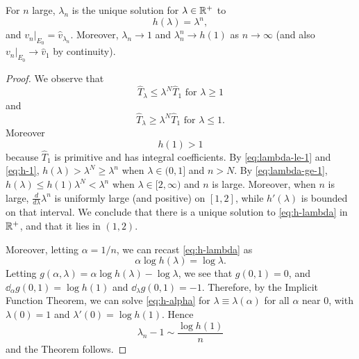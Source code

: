 \documentclass[12pt]{amsart}
\begin{document}
\begin{theorem} \label{thm:clone-eigen}
For $n$ large, 
$\lambda_n$ is the unique solution for $\lambda \in \mathbb R^+$ to
\begin{equation} \label{eq:h-lambda}
h(\lambda) = \lambda^n,
\end{equation}
and $v_n|_{E_0} = \hat v_{\lambda_n}$. 
Moreover, $\lambda_n \to 1$ and $\lambda_n^n \to h(1)$ as $n\to \infty$ (and also $v_n|_{E_0} \to \hat v_1$ by continuity). 
\end{theorem}

\begin{proof}
We observe that 
\begin{equation} \label{eq:lambda-ge-1}
\hat T_\lambda \le \lambda^N \hat T_1 \text{ for $\lambda \ge 1$}
\end{equation}
and 
\begin{equation} \label{eq:lambda-le-1}
\hat T_\lambda \ge \lambda^N \hat T_1 \text{ for $\lambda \le 1$}.
\end{equation}
Moreover
\begin{equation} \label{eq:h-1}
h(1) > 1
\end{equation}
because $\hat T_1$ is primitive and has integral coefficients.
By \eqref{eq:lambda-le-1} and \eqref{eq:h-1},
$h(\lambda) > \lambda^N \ge \lambda^n$ when $\lambda \in (0, 1]$ and $n > N$.
By \eqref{eq:lambda-ge-1}, 
$h(\lambda) \le h(1) \lambda^N < \lambda^n$ when $\lambda \in [2, \infty)$ and $n$ is large.
Moreover,
when $n$ is large,
$\frac{d}{d\lambda}\lambda^n$ is uniformly large (and positive) on $[1, 2]$, while $h'(\lambda)$ is bounded on that interval.
We conclude that there is a unique solution to \eqref{eq:h-lambda} in $\mathbb R^+$, and that it lies in $(1, 2)$. 

Moreover, 
letting $\alpha = 1/n$, 
we can recast \eqref{eq:h-lambda} as 
\begin{equation} \label{eq:h-alpha}
\alpha \log h(\lambda) = \log \lambda.
\end{equation}
Letting $g(\alpha, \lambda) = \alpha \log h(\lambda) -\log \lambda$, we see that $g(0, 1) = 0$, and $\dd_\alpha g(0, 1) = \log h(1)$ and $\dd_\lambda g(0, 1) = -1$.
Therefore, 
by the Implicit Function Theorem,
we can solve \eqref{eq:h-alpha} for $\lambda \equiv\lambda(\alpha)$ for all $\alpha$ near 0,
with $\lambda(0) = 1$ and $\lambda'(0) = \log h(1)$. 
Hence
$$
\lambda_n - 1 \sim \frac{\log h(1)}n
$$
and the Theorem follows.
\end{proof}
\end{document}

